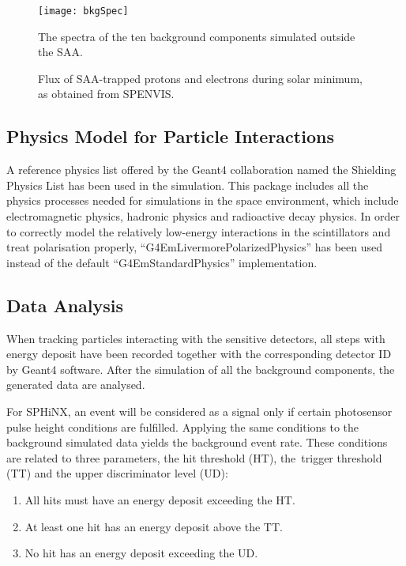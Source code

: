 \documentclass[galaxies,article,accept,moreauthors,pdftex,10pt,a4paper]{mdpi}
\begin{document}
\begin{figure}[H]
\centering
\texttt{[image: bkgSpec]}
\caption{The spectra of the ten background components simulated outside the SAA.} %
\label{fig:inputspec}
\end{figure}
\unskip
\vspace{-12pt}
\begin{figure}[H]
\centering
{}
\hfill
{}
\captionsetup{width=1\linewidth}
\caption{Flux of SAA-trapped protons and electrons during solar minimum, as obtained from SPENVIS.} %
\label{fig:saaflux}
\end{figure}


\subsection{Physics Model for Particle Interactions}
A reference physics list offered by the Geant4 collaboration named the Shielding Physics List has been used in the simulation. This package includes all the physics processes needed for simulations in the space environment, which include electromagnetic physics, hadronic physics and radioactive decay physics.
In order to correctly model the relatively low-energy interactions in the scintillators and treat polarisation properly, ``G4EmLivermorePolarizedPhysics'' has been used instead of the default ``G4EmStandardPhysics'' implementation.

\subsection{Data Analysis}

When tracking particles interacting with the sensitive detectors, all steps with energy deposit have been recorded together with the corresponding detector ID by Geant4 software. After the simulation of all the background components, the generated data are analysed.

For SPHiNX, an event will be considered as a signal only if certain photosensor pulse height conditions are fulfilled. Applying the same conditions to the background simulated data yields the background event rate. These conditions are related to three parameters, the hit threshold (HT), the~trigger threshold (TT) and the upper discriminator level (UD):
\begin{enumerate}[leftmargin=*, labelsep=4.9mm]
\item	All hits must have an energy deposit exceeding the HT.
\item	At least one hit has an energy deposit above the TT.
\item	No hit has an energy deposit exceeding the UD.
\end{enumerate}
\end{document}
